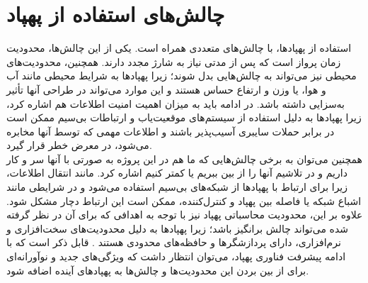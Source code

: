  \section{چالش‌های استفاده از پهپاد}
 استفاده از پهپادها، با چالش‌های متعددی همراه است. یکی از این چالش‌ها، محدودیت زمان پرواز است که پس از مدتی نیاز به شارژ مجدد دارند. 
 همچنین، محدودیت‌های محیطی نیز می‌تواند به چالش‌هایی بدل شوند؛ زیرا پهپادها به شرایط محیطی مانند آب و هوا، یا وزن و ارتفاع حساس هستند و این موارد می‌تواند 
 در طراحی آنها تأثیر به‌سزایی داشته باشد. در ادامه باید به میزان اهمیت امنیت اطلاعات هم اشاره کرد، زیرا پهپادها به دلیل استفاده از سیستم‌های موقعیت‌یاب و ارتباطات بی‌سیم ممکن 
 است در برابر حملات سایبری آسیب‌پذیر باشند و اطلاعات مهمی که توسط آنها مخابره می‌شود، در معرض خطر قرار گیرد.
 \\
 همچنین می‌توان به برخی چالش‌هایی که ما هم در این پروژه به صورتی با آنها سر و کار داریم و در تلاشیم آنها را از بین ببریم یا کمتر کنیم اشاره کرد. 
 مانند انتقال اطلاعات، زیرا برای ارتباط با پهپادها از شبکه‌های بی‌سیم استفاده می‌شود و در شرایطی مانند اشباع شبکه یا فاصله بین پهپاد و کنترل‌کننده، ممکن است این ارتباط دچار مشکل شود.
 علاوه بر این، محدودیت محاسباتی پهپاد نیز با توجه به اهدافی که برای آن در نظر گرفته شده می‌تواند چالش برانگیز باشد؛ زیرا پهپادها به دلیل محدودیت‌های سخت‌افزاری و نرم‌افزاری، دارای پردازشگرها و حافظه‌های محدودی هستند \cite{hassanalian2017classifications}.
 قابل ذکر است که با ادامه پیشرفت فناوری پهپاد، می‌توان انتظار داشت که ویژگی‌های جدید و نوآورانه‌ای برای از بین بردن این محدودیت‌ها و چالش‌ها به‌ پهپادهای آینده اضافه شود.

